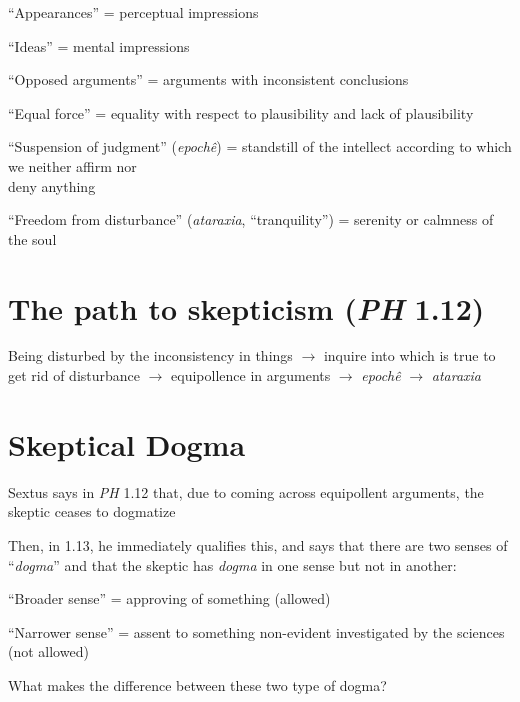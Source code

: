 \documentclass[11pt]{article}
\begin{document}
``Appearances'' = perceptual impressions
\vspace*{1mm}

``Ideas'' = mental impressions
\vspace*{1mm}

``Opposed arguments'' = arguments with inconsistent conclusions
\vspace*{1mm}

``Equal force'' = equality with respect to plausibility and lack of plausibility
\vspace*{1mm}

``Suspension of judgment'' (\emph{epoch\^{e}}) = standstill of the intellect according to which we neither affirm nor\\\hspace*{7mm}deny anything
\vspace*{1mm}

``Freedom from disturbance'' (\emph{ataraxia}, ``tranquility'') = serenity or calmness of the soul
\section*{The path to skepticism (\emph{PH} 1.12)}

\noindent Being disturbed by the inconsistency in things $\rightarrow$ inquire into which is true to get rid of disturbance $\rightarrow$ equipollence in arguments $\rightarrow$ \emph{epoch\^{e}} $\rightarrow$ \emph{ataraxia}

\section*{Skeptical Dogma}

\noindent Sextus says in \emph{PH} 1.12 that, due to coming across equipollent arguments, the skeptic ceases to dogmatize
\vspace*{2mm}

\noindent Then, in 1.13, he immediately qualifies this, and says that there are two senses of ``\emph{dogma}'' and that the skeptic has \emph{dogma} in one sense but not in another:
\vspace*{2mm}

``Broader sense'' = approving of something (allowed)
\vspace*{1mm}

``Narrower sense'' = assent to something non-evident investigated by the sciences (not allowed)
\vspace*{2mm}

\noindent What makes the difference between these two type of dogma?
\vspace*{2mm}
\end{document}
